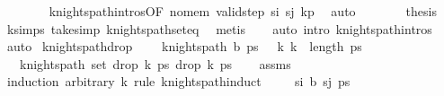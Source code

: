 \begin{isabellebody}
\ \ \ \ \ \ \isamarkupfalse%
\ knights{\isacharunderscore}{\kern0pt}path{\isachardot}{\kern0pt}intros{\isacharparenleft}{\kern0pt}{}{\isacharparenright}{\kern0pt}{\isacharbrackleft}{\kern0pt}OF\ no{\isacharunderscore}{\kern0pt}mem\ {\isacartoucheopen}valid{\isacharunderscore}{\kern0pt}step\ s\isactrlsub i\ s\isactrlsub j{\isacartoucheclose}\ kp{\isacharbrackright}{\kern0pt}\ \isamarkupfalse%
\ auto\isanewline
\ \ \ \ \isamarkupfalse%
\ \isamarkupfalse%
\ {\isacharquery}{\kern0pt}thesis\ \isamarkupfalse%
\ k{\isacharunderscore}{\kern0pt}simps\ take{\isacharunderscore}{\kern0pt}simp{}\ knights{\isacharunderscore}{\kern0pt}path{\isacharunderscore}{\kern0pt}set{\isacharunderscore}{\kern0pt}eq\ \isamarkupfalse%
\ metis\isanewline
\ \ \isamarkupfalse%
\ {\isacharparenleft}{\kern0pt}auto\ intro{\isacharcolon}{\kern0pt}\ knights{\isacharunderscore}{\kern0pt}path{\isachardot}{\kern0pt}intros{\isacharparenright}{\kern0pt}\isanewline
{}\isamarkupfalse%
\ auto%
\endisatagproof
{\isafoldproof}%
%
\isadelimproof
\isanewline
%
\endisadelimproof
\isanewline
{}\isamarkupfalse%
\ knights{\isacharunderscore}{\kern0pt}path{\isacharunderscore}{\kern0pt}drop{\isacharcolon}{\kern0pt}\ \isanewline
\ \ \ {\isachardoublequoteopen}knights{\isacharunderscore}{\kern0pt}path\ b\ ps{\isachardoublequoteclose}\ {\isachardoublequoteopen}{}\ {\isacharless}{\kern0pt}\ k{\isachardoublequoteclose}\ {\isachardoublequoteopen}k\ {\isacharless}{\kern0pt}\ length\ ps{\isachardoublequoteclose}\isanewline
\ \ \ {\isachardoublequoteopen}knights{\isacharunderscore}{\kern0pt}path\ {\isacharparenleft}{\kern0pt}set\ {\isacharparenleft}{\kern0pt}drop\ k\ ps{\isacharparenright}{\kern0pt}{\isacharparenright}{\kern0pt}\ {\isacharparenleft}{\kern0pt}drop\ k\ ps{\isacharparenright}{\kern0pt}{\isachardoublequoteclose}\isanewline
%
\isadelimproof
\ \ %
\endisadelimproof
%
\isatagproof
{}\isamarkupfalse%
\ assms\isanewline
{}\isamarkupfalse%
\ {\isacharparenleft}{\kern0pt}induction\ arbitrary{\isacharcolon}{\kern0pt}\ k\ rule{\isacharcolon}{\kern0pt}\ knights{\isacharunderscore}{\kern0pt}path{\isachardot}{\kern0pt}induct{\isacharparenright}{\kern0pt}\isanewline
\ \ \isamarkupfalse%
\ {\isacharparenleft}{\kern0pt}{}\ s\isactrlsub i\ b\ s\isactrlsub j\ ps{\isacharparenright}{\kern0pt}\isanewline
\ \ \isamarkupfalse%
\ \isamarkupfalse%

\end{isabellebody}
